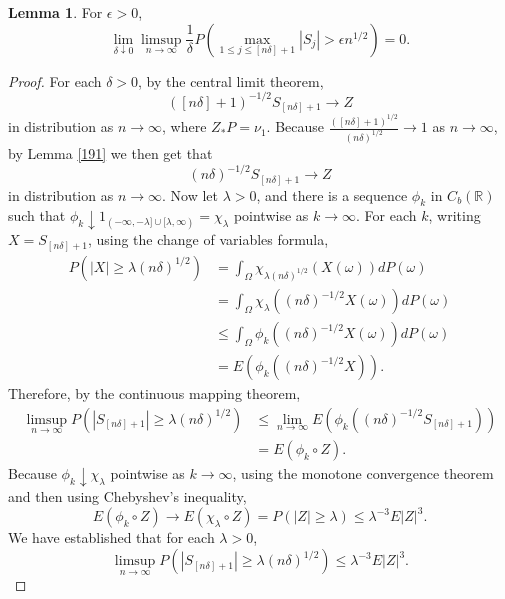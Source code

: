 \documentclass{article}
\theoremstyle{definition}
\newtheorem{lemma}[theorem]{Lemma}
\theoremstyle{definition}
\begin{document}
\begin{lemma}
For $\epsilon>0$,
\[
\lim_{\delta \downarrow 0} \limsup_{n \to \infty} \frac{1}{\delta} P\left(\max_{1 \leq j \leq [n\delta]+1} |S_j| > \epsilon n^{1/2} \right)=0.
\]
\label{lemma418}
\end{lemma}
\begin{proof}
For each $\delta>0$, by the central limit theorem,
\[
([n\delta]+1)^{-1/2} S_{[n\delta]+1} \to Z
\]
in distribution as $n \to \infty$, where $Z_*P=\nu_1$.  Because $\frac{([n\delta]+1)^{1/2}}{(n\delta)^{1/2}} \to 1$ as $n \to \infty$, by Lemma \ref{191} we then
get that
\[
(n\delta)^{-1/2} S_{[n\delta]+1} \to Z
\]
in distribution as $n \to \infty$.
Now let $\lambda>0$, and there is a sequence $\phi_k$ in $C_b(\mathbb{R})$ such that
$\phi_k \downarrow 1_{(-\infty,-\lambda] \cup [\lambda,\infty)}=\chi_\lambda$ pointwise as $k \to \infty$. 
For each $k$, writing $X=S_{[n\delta]+1}$, using the change of variables formula,
\begin{align*}
P(|X| \geq \lambda (n\delta)^{1/2})
&=
\int_\Omega 
 \chi_{\lambda (n\delta)^{1/2}}(X(\omega)) dP(\omega)\\
 & = 
\int_\Omega \chi_{\lambda}((n\delta)^{-1/2} X(\omega)) dP(\omega)\\
&\leq \int_\Omega \phi_k((n\delta)^{-1/2} X(\omega)) dP(\omega)\\
&=E(\phi_k((n\delta)^{-1/2}X)).
\end{align*}
Therefore, by the continuous mapping theorem,
\begin{align*}
\limsup_{n \to \infty} P(|S_{[n\delta]+1}| \geq \lambda (n\delta)^{1/2})&\leq \lim_{n \to \infty} E(\phi_k((n\delta)^{-1/2}S_{[n\delta]+1}))\\
&=E(\phi_k \circ Z).
\end{align*}
Because $\phi_k \downarrow \chi_\lambda$ pointwise as $k \to \infty$, using the monotone convergence theorem and then using Chebyshev's inequality,
\[
E(\phi_k \circ Z) \to E(\chi_\lambda \circ Z) =  P(|Z| \geq \lambda) \leq \lambda^{-3} E|Z|^3.
\]
We have established that for each $\lambda>0$,
\begin{equation}
\limsup_{n \to \infty} P(|S_{[n\delta]+1}| \geq \lambda (n\delta)^{1/2}) \leq  \lambda^{-3} E|Z|^3.
\label{412}
\end{equation}


\end{proof}
\end{document}
